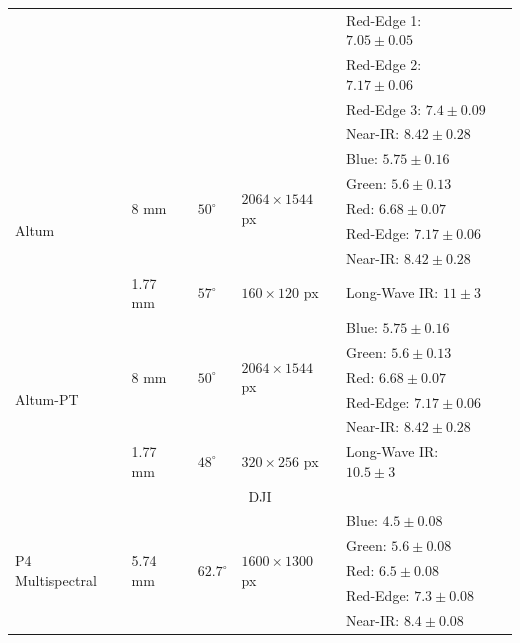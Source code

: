 \begin{table}[htb]
\begin{tabular}{llllll}
        & & & & Red-Edge 1: $7.05 \pm 0.05$ &\\
        & & & & Red-Edge 2: $7.17 \pm 0.06$ &\\
        & & & & Red-Edge 3: $7.4 \pm 0.09$ &\\
        & & & & Near-IR: $8.42 \pm 0.28$ &\\
        \cmidrule{1-6}
        \multirow{6}{*}{Altum}     & \multirow{5}{*}{8 \si{\milli\meter}}   & \multirow{5}{*}{$50^{\circ}$}  & \multirow{5}{*}{$2064 \times 1544$ px} & Blue: $5.75 \pm 0.16$    & \multirow{6}{*}{\cite{hutton_high_2020}}\\
        & & & & Green: $5.6 \pm 0.13$ &\\
        & & & & Red: $6.68 \pm 0.07$ &\\
        & & & & Red-Edge: $7.17 \pm 0.06$ &\\
        & & & & Near-IR: $8.42 \pm 0.28$ &\\
        \cmidrule{2-6}
        & \multirow{1}{*}{1.77 \si{\milli\meter}} & \multirow{1}{*}{$57^{\circ}$} & \multirow{1}{*}{$160 \times 120$ px} & Long-Wave IR: $11 \pm 3$ &\\
        \cmidrule{1-6}
        \multirow{6}{*}{Altum-PT}     & \multirow{5}{*}{8 \si{\milli\meter}}   & \multirow{5}{*}{$50^{\circ}$}  & \multirow{5}{*}{$2064 \times 1544$ px} & Blue: $5.75 \pm 0.16$    & \multirow{6}{*}{\cite{hutton_high_2020}}\\
        & & & & Green: $5.6 \pm 0.13$ &\\
        & & & & Red: $6.68 \pm 0.07$ &\\
        & & & & Red-Edge: $7.17 \pm 0.06$ &\\
        & & & & Near-IR: $8.42 \pm 0.28$ &\\
        \cmidrule{2-6}
        & \multirow{1}{*}{1.77 \si{\milli\meter}} & \multirow{1}{*}{$48^{\circ}$} & \multirow{1}{*}{$320 \times 256$ px} & Long-Wave IR: $10.5 \pm 3$ &\\
        \cmidrule{1-6}
        \multicolumn{6}{c}{DJI}\\
        \cmidrule{1-6}
        \multirow{5}{*}{P4 Multispectral}     & \multirow{5}{*}{5.74 \si{\milli\meter}}   & \multirow{5}{*}{$62.7^{\circ}$}  & \multirow{5}{*}{$1600 \times 1300$ px} & Blue: $4.5 \pm 0.08$    & \multirow{5}{*}{\cite{lu_experimental_2020}}\\
        & & & & Green: $5.6 \pm 0.08$ &\\
        & & & & Red: $6.5 \pm 0.08$ &\\
        & & & & Red-Edge: $7.3 \pm 0.08$ &\\
        & & & & Near-IR: $8.4 \pm 0.08$ &\\
        \bottomrule
    \end{tabular}
\end{table}
\renewcommand{\arraystretch}{1}

